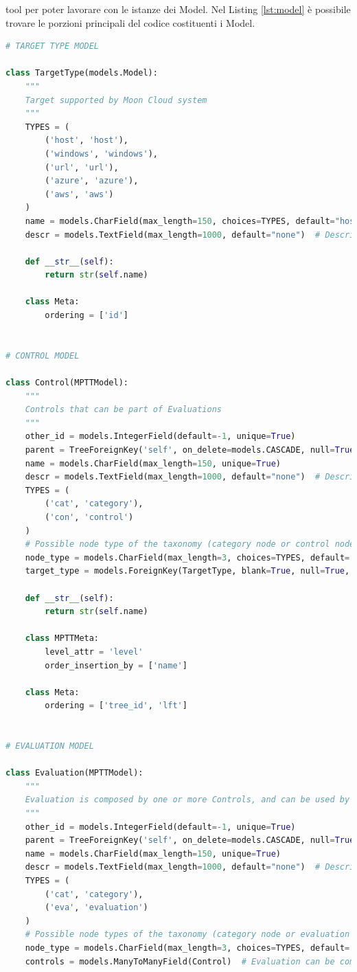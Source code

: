 tool per poter lavorare con le istanze dei Model. Nel Listing \ref{lst:model} è possibile trovare le porzioni principali del 
codice costituenti i Model.
%
\lstset{style=python_code_style}
\begin{lstlisting}[language=Python, label=lst:model, caption={Parti principali del codice che costituiscono i Model della soluzione.}]
# TARGET TYPE MODEL
 
class TargetType(models.Model):
    """
    Target supported by Moon Cloud system
    """
    TYPES = (
        ('host', 'host'),
        ('windows', 'windows'),
        ('url', 'url'),
        ('azure', 'azure'),
        ('aws', 'aws')
    )
    name = models.CharField(max_length=150, choices=TYPES, default="host")
    descr = models.TextField(max_length=1000, default="none")  # Description of a target
 
    def __str__(self):
        return str(self.name)
 
    class Meta:
        ordering = ['id']
 
 
# CONTROL MODEL
 
class Control(MPTTModel):
    """
    Controls that can be part of Evaluations
    """
    other_id = models.IntegerField(default=-1, unique=True)
    parent = TreeForeignKey('self', on_delete=models.CASCADE, null=True, blank=True, related_name='children')
    name = models.CharField(max_length=150, unique=True)
    descr = models.TextField(max_length=1000, default="none")  # Description of a node in the taxonomy
    TYPES = (
        ('cat', 'category'),
        ('con', 'control')
    )
    # Possible node type of the taxonomy (category node or control node)
    node_type = models.CharField(max_length=3, choices=TYPES, default='cat')
    target_type = models.ForeignKey(TargetType, blank=True, null=True, on_delete=models.CASCADE)  # It's null for the root node and category nodes
 
    def __str__(self):
        return str(self.name)
 
    class MPTTMeta:
        level_attr = 'level'
        order_insertion_by = ['name']
 
    class Meta:
        ordering = ['tree_id', 'lft']
 
 
# EVALUATION MODEL
 
class Evaluation(MPTTModel):
    """
    Evaluation is composed by one or more Controls, and can be used by Users
    """
    other_id = models.IntegerField(default=-1, unique=True)
    parent = TreeForeignKey('self', on_delete=models.CASCADE, null=True, blank=True, related_name='children')
    name = models.CharField(max_length=150, unique=True)
    descr = models.TextField(max_length=1000, default="none")  # Description of a node in the taxonomy
    TYPES = (
        ('cat', 'category'),
        ('eva', 'evaluation')
    )
    # Possible node types of the taxonomy (category node or evaluation node)
    node_type = models.CharField(max_length=3, choices=TYPES, default='cat')
    controls = models.ManyToManyField(Control)  # Evaluation can be composed of one or more controls
 

\end{lstlisting}
